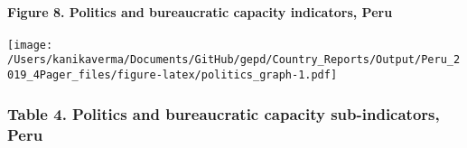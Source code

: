 \documentclass[twocolumn]{article}
\let\oldparagraph\paragraph
\renewcommand{\paragraph}[1]{\oldparagraph{#1}\mbox{}}
\begin{document}
\hypertarget{figure-8.-politics-and-bureaucratic-capacity-indicators-peru}{%
\paragraph{Figure 8. Politics and bureaucratic capacity indicators,
Peru}\label{figure-8.-politics-and-bureaucratic-capacity-indicators-peru}}

\texttt{[image: /Users/kanikaverma/Documents/GitHub/gepd/Country\_Reports/Output/Peru\_2019\_4Pager\_files/figure-latex/politics\_graph-1.pdf]}

\hypertarget{table-4.-politics-and-bureaucratic-capacity-sub-indicators-peru}{%
\subsubsection{Table 4. Politics and bureaucratic capacity
sub-indicators,
Peru}\label{table-4.-politics-and-bureaucratic-capacity-sub-indicators-peru}}
\end{document}
